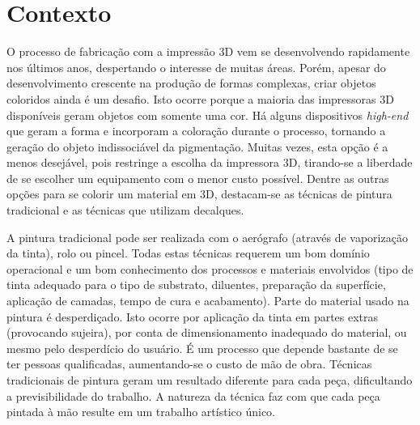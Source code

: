 
\acresetall 

\section{Contexto}

O processo de fabricação com a impressão 3D vem se desenvolvendo rapidamente nos últimos anos, despertando o interesse de muitas áreas. Porém, apesar do desenvolvimento crescente na produção de formas complexas, criar objetos coloridos ainda é um desafio. Isto ocorre porque a maioria das impressoras 3D disponíveis geram objetos com somente uma cor. Há alguns dispositivos \textit{high-end} que geram a forma e incorporam a coloração durante o processo, tornando a geração do objeto indissociável da pigmentação. Muitas vezes, esta opção é a menos desejável, pois restringe a escolha da impressora 3D, tirando-se a liberdade de se escolher um equipamento com o menor custo possível. Dentre as outras opções para se colorir um material em 3D, destacam-se as técnicas de pintura tradicional e as técnicas que utilizam decalques.

A pintura tradicional pode ser realizada com o aerógrafo (através de vaporização da tinta), rolo ou pincel. Todas estas técnicas requerem um bom domínio operacional e um bom conhecimento dos processos e materiais envolvidos (tipo de tinta adequado para o tipo de substrato, diluentes, preparação da superfície, aplicação de camadas, tempo de cura e acabamento). Parte do material usado na pintura é desperdiçado. Isto ocorre por aplicação da tinta em partes extras (provocando sujeira), por conta de dimensionamento inadequado do material, ou mesmo pelo desperdício do usuário. É um processo que depende bastante de se ter pessoas qualificadas, aumentando-se o custo de mão de obra. Técnicas tradicionais de pintura geram um resultado diferente para cada peça, dificultando a previsibilidade do trabalho. A natureza da técnica faz com que cada peça pintada à mão resulte em um trabalho artístico único.

